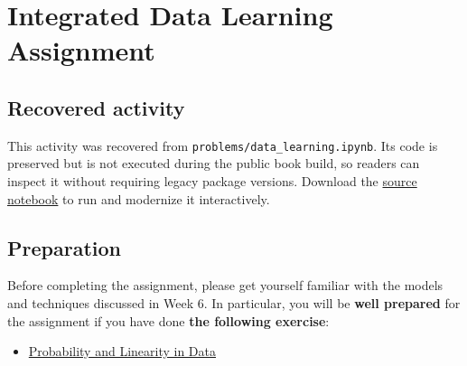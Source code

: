 \documentclass[
  letterpaper,
]{scrbook}
\providecommand{\tightlist}{%
  \setlength{\itemsep}{0pt}\setlength{\parskip}{0pt}}
\begin{document}
\chapter*{Integrated Data Learning
Assignment}\label{ch-lab-integrated-learning-assignment}


\section*{Recovered
activity}\label{sec-lab-integrated-learning-assignment}


\begin{tcolorbox}[enhanced jigsaw, arc=.35mm, bottomrule=.15mm, bottomtitle=1mm, breakable, colback=white, colbacktitle=quarto-callout-note-color!10!white, colframe=quarto-callout-note-color-frame, coltitle=black, left=2mm, leftrule=.75mm, opacityback=0, opacitybacktitle=0.6, rightrule=.15mm, title=\textcolor{quarto-callout-note-color}{\faInfo}\hspace{0.5em}{Historical source and execution note}, titlerule=0mm, toprule=.15mm, toptitle=1mm]

This activity was recovered from \texttt{problems/data\_learning.ipynb}.
Its code is preserved but is not executed during the public book build,
so readers can inspect it without requiring legacy package versions.
Download the
\href{../notebooks/integrated-learning-assignment.ipynb}{source
notebook} to run and modernize it interactively.

\end{tcolorbox}

\section*{Preparation}\label{preparation-2}


Before completing the assignment, please get yourself familiar with the
models and techniques discussed in Week 6. In particular, you will be
\textbf{well prepared} for the assignment if you have done \textbf{the
following exercise}:

\begin{itemize}
\tightlist
\item[$\square$]
  \href{../demo/data_prob_linear.html}{Probability and Linearity in
  Data}
\end{itemize}
\end{document}
